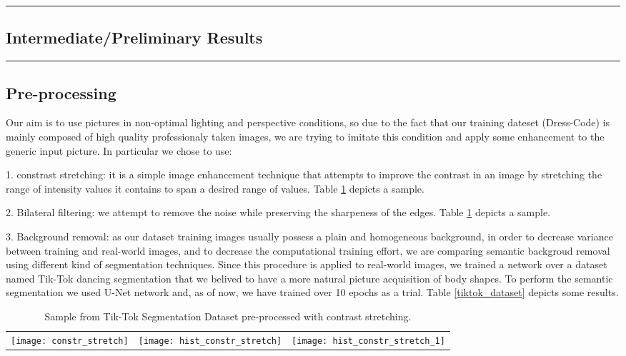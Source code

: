 {\color{gray}\hrule}
\begin{center}
\section{Intermediate/Preliminary Results}
\end{center}

{\color{gray}\hrule}


\begin{multicols}{2}

\subsection{Pre-processing}
Our aim is to use pictures in non-optimal lighting and perspective conditions, so due to the fact that our training dateset (Dress-Code) is mainly composed of high quality professionaly taken images, we are trying to imitate this condition and apply some enhancement to the generic input picture. In particular we chose to use:

1. constrast stretching: it is a simple image enhancement technique that attempts to improve the contrast in an image by stretching the range of intensity values it contains to span a desired range of values. Table \ref{contr_stretch} depicts a sample.

2. Bilateral filtering: we attempt to remove the noise while preserving the sharpeness of the edges. Table \ref{contr_stretch} depicts a sample.

3. Background removal: as our dataset training images usually possess a plain and homogeneous background, in order to decrease variance between training and real-world images, and to decrease the computational training effort, we are comparing semantic backgroud removal using different kind of segmentation techniques. Since this procedure is applied to real-world images, we trained a network over a dataset named Tik-Tok dancing segmentation that we belived to have a more natural picture acquisition of body shapes. To perform the semantic segmentation we used U-Net network and, as of now, we have trained over 10 epochs as a trial. Table \ref{tiktok_dataset} depicts some results.

\end{multicols}

\FloatBarrier

\begin{table}[hbt!]
\centering
\begin{tabular}{ccc}
\texttt{[image: constr\_stretch]} & \texttt{[image: hist\_constr\_stretch]} & \texttt{[image: hist\_constr\_stretch\_1]} 
\end{tabular}
\caption{\label{contr_stretch}Sample from Tik-Tok Segmentation Dataset pre-processed with contrast stretching.}
\end{table}

